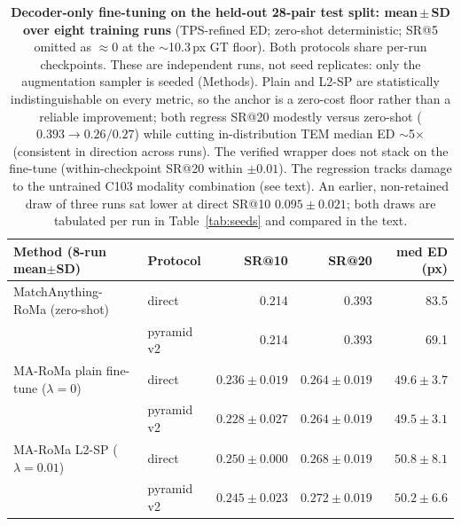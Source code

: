 \documentclass[fleqn,10pt]{wlscirep}
\begin{document}
\begin{table}[ht]
\centering
\begin{tabular}{llrrr}
\hline
Method (8-run mean$\pm$SD) & Protocol & SR@10 & SR@20 & med ED (px) \\
\hline
MatchAnything-RoMa (zero-shot)          & direct     & 0.214 & 0.393 & 83.5 \\
                                        & pyramid v2 & 0.214 & 0.393 & 69.1 \\
\hline
MA-RoMa plain fine-tune ($\lambda{=}0$) & direct     & $0.236\pm0.019$ & $0.264\pm0.019$ & $49.6\pm3.7$ \\
                                        & pyramid v2 & $0.228\pm0.027$ & $0.264\pm0.019$ & $49.5\pm3.1$ \\
\hline
MA-RoMa L2-SP ($\lambda{=}0.01$)        & direct     & $0.250\pm0.000$ & $0.268\pm0.019$ & $50.8\pm8.1$ \\
                                        & pyramid v2 & $0.245\pm0.023$ & $0.272\pm0.019$ & $50.2\pm6.6$ \\
\hline
\end{tabular}
\caption{\textbf{Decoder-only fine-tuning on the held-out 28-pair test split: mean\,$\pm$\,SD over eight training runs} (TPS-refined ED; zero-shot deterministic; SR@5 omitted as $\approx0$ at the $\sim$10.3\,px GT floor). Both protocols share per-run checkpoints. These are independent runs, not seed replicates: only the augmentation sampler is seeded (Methods). Plain and L2-SP are statistically indistinguishable on every metric, so the anchor is a zero-cost floor rather than a reliable improvement; both regress SR@20 modestly versus zero-shot ($0.393\rightarrow0.26/0.27$) while cutting in-distribution TEM median ED $\sim$5$\times$ (consistent in direction across runs). The verified wrapper does not stack on the fine-tune (within-checkpoint SR@20 within $\pm0.01$). The regression tracks damage to the untrained C103 modality combination (see text). An earlier, non-retained draw of three runs sat lower at direct SR@10 $0.095\pm0.021$; both draws are tabulated per run in Table~\ref{tab:seeds} and compared in the text.}
\label{tab:finetune}
\end{table}
\end{document}

